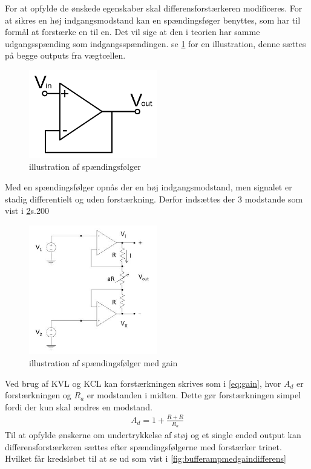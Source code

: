 For at opfylde de ønskede egenskaber skal differensforstærkeren modificeres. For at sikres en høj indgangsmodstand kan en spændingsføger benyttes, som har til formål at forstærke en til en. Det vil sige at den i teorien har samme udgangsspænding som indgangsspændingen. se \ref{fig:bufferamp} for en illustration, denne sættes på begge outputs fra vægtcellen.
\begin{figure}[H]
	\centering
	\includegraphics[width=0.5\textwidth]{billeder/Hardware/bufferamp.png}
	\caption{illustration af spændingsfølger}
	\label{fig:bufferamp}
\end{figure}
Med en spændingsfølger opnås der en høj indgangsmodstand, men signalet er stadig differentielt og uden forstærkning. Derfor indsættes der 3 modstande som vist i \ref{fig:bufferampmedgain}\citep{ASBbog}s.200
\begin{figure}[H]
	\centering
	\includegraphics[width=0.5\textwidth]{billeder/Hardware/bufferampgain.JPG}
	\caption{illustration af spændingsfølger med gain}
	\label{fig:bufferampmedgain}
\end{figure}
Ved brug af KVL og KCL kan forstærkningen skrives som i \ref{eq:gain}, hvor $A_{d}$ er forstærkningen og $R_{a}$ er modstanden i midten. Dette gør forstærkningen simpel fordi der kun skal ændres en modstand. 
\begin{align}
 A_{d}=1+\frac{R+R}{R_{a}}
 \label{eq:gain}
 \end{align}
 Til at opfylde ønskerne om undertrykkelse af støj og et single ended output kan differensforstærkeren sættes efter spændingsfølgerne med forstærker trinet. Hvilket får kredsløbet til at se ud som vist i \ref{fig:bufferampmedgaindifferens}
 
